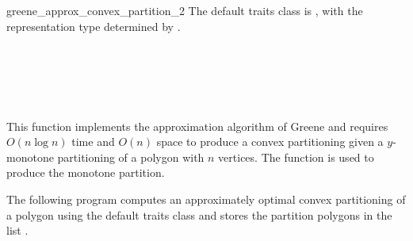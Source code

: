 \begin{ccRefFunction}{greene_approx_convex_partition_2}
The default traits class  is ,
with the representation type determined by .

\ccSeeAlso
{} \\
 \\
 \\
 \\

\ccImplementation
This function implements the approximation algorithm of 
Greene \cite{g-dpcp-83} and requires $O(n \log n)$ time and $O(n)$ space
to produce a convex partitioning given a $y$-monotone partitioning of a
polygon with $n$ vertices.  The function  
is used to produce the monotone partition.

\ccExample
The following program computes an approximately optimal
convex partitioning of a polygon using the default
traits class and stores the partition polygons in the list 
.



\end{ccRefFunction}
